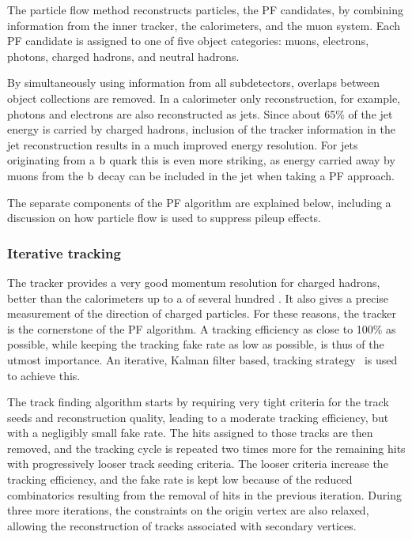 The particle flow method reconstructs particles, the PF candidates, by combining information from
the inner tracker, the calorimeters, and the muon system.  Each PF candidate is assigned to one of
five object categories: muons, electrons, photons, charged hadrons, and neutral hadrons.  

By simultaneously using information from all subdetectors, overlaps between object collections are
removed. In a calorimeter only reconstruction, for example, photons and electrons are also
reconstructed as jets. 
Since about 65\% of the jet energy is carried by charged hadrons, inclusion of the tracker
information in the jet reconstruction results in a much improved energy resolution. For jets
originating from a $\mathrm{b}$ quark this is even more striking, as energy carried away by muons from
the $\mathrm{b}$ decay can be included in the jet when taking a PF approach. 

The separate components of the PF algorithm are explained below, including a discussion on how
particle flow is used to suppress pileup effects.


\subsubsection{Iterative tracking}

The tracker provides a very good momentum resolution for charged hadrons, better than the
calorimeters up to a \pt of several hundred \GeV. It also gives a precise measurement of the
direction of charged particles. For these reasons, the tracker is the cornerstone of the PF
algorithm. A tracking efficiency as close to 100\% as possible, while keeping the tracking fake rate
as low as possible, is thus of the utmost importance.
An iterative, Kalman filter based, tracking strategy~\cite{Chatrchyan:2014fea} is used to achieve
this.

The track finding algorithm starts by requiring very tight criteria for the track seeds and
reconstruction quality, leading to a moderate tracking efficiency, but with a negligibly small fake
rate. 
The hits assigned to those tracks are then removed, and the tracking cycle is repeated two times
more for the remaining hits with progressively looser track seeding criteria. The looser criteria
increase the tracking efficiency, and the fake rate is kept low because of the reduced combinatorics
resulting from the removal of hits in the previous iteration. 
During three more iterations, the constraints on the origin vertex are also relaxed, allowing
the reconstruction of tracks associated with secondary vertices. 

